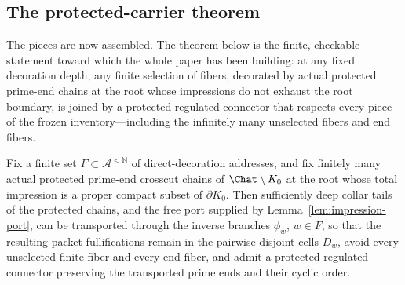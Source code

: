 \subsection{The protected-carrier theorem}\label{subsec:F-carrier}

The pieces are now assembled.  The theorem below is the finite,
checkable statement toward which the whole paper has been building: at
any fixed decoration depth, any finite selection of fibers, decorated by
actual protected prime-end chains at the root whose impressions do not
exhaust the root boundary, is joined by a protected regulated connector
that respects every piece of the frozen inventory---including the
infinitely many unselected fibers and end fibers.

\begin{theorem}\label{thm:carrier}
Fix a finite set $F\subset\mathcal A^{<\mathbb N}$ of direct-decoration
addresses, and fix finitely many actual protected prime-end crosscut
chains of $\Chat\setminus K_0$ at the root whose total impression is a
proper compact subset of $\partial K_0$.  Then sufficiently deep collar tails of the protected
chains, and the free port supplied by
Lemma~\ref{lem:impression-port}, can be transported through the inverse
branches $\phi_w$, $w\in F$, so that the resulting packet fullifications
remain in the pairwise disjoint cells $D_w$, avoid every unselected
finite fiber and every end fiber, and admit a protected regulated
connector preserving the transported prime ends and their cyclic order.
\end{theorem}

